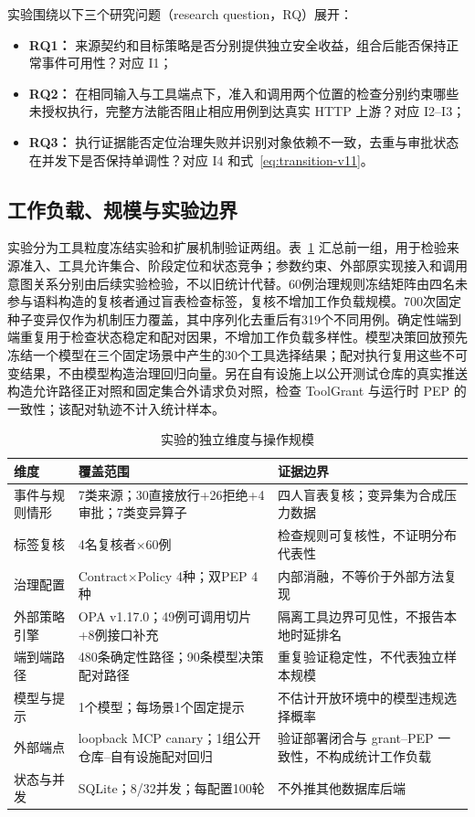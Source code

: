 实验围绕以下三个研究问题（research question，RQ）展开：
\begin{itemize}
  \item \textbf{RQ1：} 来源契约和目标策略是否分别提供独立安全收益，组合后能否保持正常事件可用性？对应 I1；
  \item \textbf{RQ2：} 在相同输入与工具端点下，准入和调用两个位置的检查分别约束哪些未授权执行，完整方法能否阻止相应用例到达真实 HTTP 上游？对应 I2--I3；
  \item \textbf{RQ3：} 执行证据能否定位治理失败并识别对象依赖不一致，去重与审批状态在并发下是否保持单调性？对应 I4 和式~\eqref{eq:transition-v11}。
\end{itemize}

\subsection{工作负载、规模与实验边界}

实验分为工具粒度冻结实验和扩展机制验证两组。表~\ref{tab:scale-v11} 汇总前一组，用于检验来源准入、工具允许集合、阶段定位和状态竞争；参数约束、外部原实现接入和调用意图关系分别由后续实验检验，不以旧统计代替。60例治理规则冻结矩阵由四名未参与语料构造的复核者通过盲表检查标签，复核不增加工作负载规模。700次固定种子变异仅作为机制压力覆盖，其中序列化去重后有319个不同用例。确定性端到端重复用于检查状态稳定和配对因果，不增加工作负载多样性。模型决策回放预先冻结一个模型在三个固定场景中产生的30个工具选择结果；配对执行复用这些不可变结果，不由模型构造治理回归向量。另在自有设施上以公开测试仓库的真实推送构造允许路径正对照和固定集合外请求负对照，检查 ToolGrant 与运行时 PEP 的一致性；该配对轨迹不计入统计样本。

\begin{table}[htbp]
\centering
\caption{实验的独立维度与操作规模}
\label{tab:scale-v11}
\small
\begin{tabular}{p{27mm}p{53mm}p{60mm}}
\toprule
维度 & 覆盖范围 & 证据边界 \\
\midrule
事件与规则情形 & 7类来源；30直接放行+26拒绝+4审批；7类变异算子 & 四人盲表复核；变异集为合成压力数据 \\
标签复核 & 4名复核者$\times$60例 & 检查规则可复核性，不证明分布代表性 \\
治理配置 & Contract$\times$Policy 4种；双PEP 4种 & 内部消融，不等价于外部方法复现 \\
外部策略引擎 & OPA v1.17.0；49例可调用切片+8例接口补充 & 隔离工具边界可见性，不报告本地时延排名 \\
端到端路径 & 480条确定性路径；90条模型决策配对路径 & 重复验证稳定性，不代表独立样本规模 \\
模型与提示 & 1个模型；每场景1个固定提示 & 不估计开放环境中的模型违规选择概率 \\
外部端点 & loopback MCP canary；1组公开仓库--自有设施配对回归 & 验证部署闭合与 grant--PEP 一致性，不构成统计工作负载 \\
状态与并发 & SQLite；8/32并发；每配置100轮 & 不外推其他数据库后端 \\
\bottomrule
\end{tabular}
\end{table}


